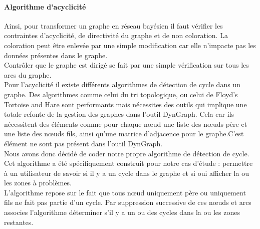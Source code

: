 \documentclass[conference]{IEEEtran}
\begin{document}
\paragraph{Algorithme d'acyclicité \\}
Ainsi, pour transformer un graphe en réseau bayésien il faut vérifier les contraintes d'acyclicité, de directivité du graphe et de non coloration. La coloration peut être enlevée par une simple modification car elle n'impacte pas les données présentes dans le graphe. \\
Contrôler que le graphe est dirigé se fait par une simple vérification sur tous les arcs du graphe.\\
Pour l'acyclicité il existe différents algorithmes de détection de cycle dans un graphe. Des algorithmes comme celui du tri topologique, ou celui de Floyd's Tortoise and Hare sont performants mais nécessites des outils qui implique une totale refonte de la gestion des graphes dans l'outil DynGraph. Cela car ils nécessitent des éléments comme pour chaque nœud une liste des nœuds père et une liste des nœuds fils, ainsi qu'une matrice d'adjacence pour le graphe.C'est élément ne sont pas présent dans l'outil DynGraph.\\
Nous avons donc décidé de coder notre propre algorithme de détection de cycle. Cet algorithme a été spécifiquement construit pour notre cas d'étude : permettre à un utilisateur de savoir si il y a un cycle dans le graphe et si oui afficher la ou les zones à problèmes. \\
L'algorithme repose sur le fait que tous nœud uniquement père ou uniquement fils ne fait pas partie d'un cycle. Par suppression successive de ces nœuds et arcs associes l'algorithme déterminer s'il y a un ou des cycles dans la ou les zones restantes.  \\
\end{document}
